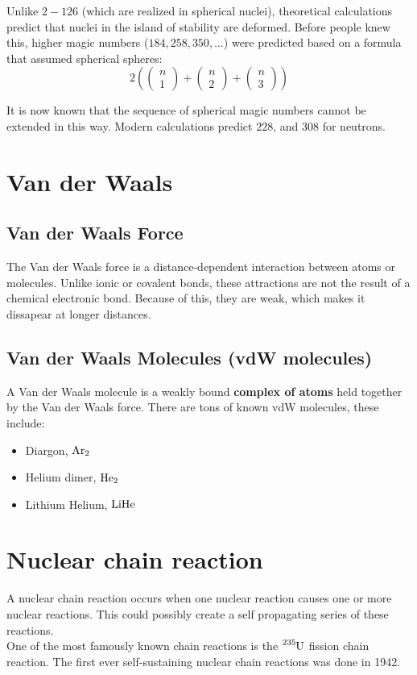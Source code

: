 \documentclass{article}
\begin{document}
\begin{multicols*}{2}
    Unlike $2-126$ (which are realized in spherical nuclei), theoretical calculations
    predict that nuclei in the island of stability are deformed. Before people knew this,
    higher magic numbers ($184, 258, 350, \ldots$) were predicted based on a formula
    that assumed spherical spheres:
    \[
      2\left(\begin{pmatrix}n\\ 1\end{pmatrix} + \begin{pmatrix}n\\ 2\end{pmatrix} + \begin{pmatrix}n\\ 3\end{pmatrix}\right)
    \] 
    
    It is now known that the sequence of spherical magic numbers cannot be extended in this
    way. Modern calculations predict $228$, and $308$ for neutrons.

    \section{Van der Waals}
    \subsection{Van der Waals Force}
    The Van der Waals force is a distance-dependent interaction between atoms or
    molecules. Unlike ionic or covalent bonds, these attractions are not the result
    of a chemical electronic bond. Because of this, they are weak, which makes it
    dissapear at longer distances.
    \subsection{Van der Waals Molecules (vdW molecules)}
    A Van der Waals molecule is a weakly bound \textbf{complex of atoms} held together
    by the Van der Waals force. There are tons of known vdW molecules, these include:
    \begin{itemize}
      \item Diargon, $\ce{Ar2}$
      \item Helium dimer, $\ce{He2}$
      \item Lithium Helium, $\ce{LiHe}$
    \end{itemize}

    \section{Nuclear chain reaction}
    A nuclear chain reaction occurs when one nuclear reaction causes one or more
    nuclear reactions. This could possibly create a self propagating series of
    these reactions.\\

    One of the most famously known chain reactions is the $\ce{^{235}U}$ fission
    chain reaction. The first ever self-sustaining nuclear chain reactions was done
    in 1942.
  \end{multicols*}
\end{document}
